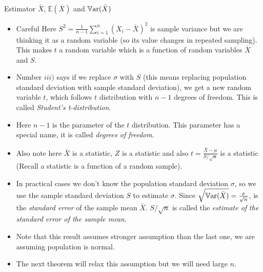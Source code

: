 \documentclass[8pt, usepdftitle=false]{beamer}
\begin{document}
\begin{frame}[allowframebreaks]{Estimator $\bar{X}$, $\mathbb{E}(\bar{X})$ and $\mathbb{V}\mathrm{ar}{(}\bar{X})$}
\begin{itemize}
  \item  {\color{red} Careful} Here $ S^{2} = \frac{1}{n-1} \sum_{i=1}^{n} (X_i - \bar{X})^2$ is sample variance but we are thinking it as a random variable (so its value changes in repeated sampling). This makes $t$ a random variable which is a function of random variables $\bar{X}$ and $S$. 

  \item Number $iii)$ says if we replace $\sigma$ with $S$ (this means replacing population standard deviation with sample standard deviation), we get a new random variable $t$, which follows $t$ distribution with $n-1$ degrees of freedom. This is called \emph{Student's t-distribution}. 

  \item Here $n- 1$ is the parameter of the $t$ distribution. This parameter has a special name, it is called \emph{degrees of freedom}. 



  \item Also note here $\bar{X}$ is a statistic, $Z$ is a statistic and also $t = \frac{\bar{X} - \mu}{S / \sqrt{n}} $ is a statistic (Recall a statistic is a function of a random sample). 

  \item In practical cases we don't know the population standard deviation $\sigma$, so we use the sample standard deviation $S$ to estimate $\sigma$. Since $\sqrt{\mathbb{V}\mathrm{ar}{(}\bar{X})} = \frac{\sigma}{\sqrt{n}}$, is the \emph{standard error} of the sample mean $\bar{X}$. $S / \sqrt{n}$ is called the \emph{estimate of the standard error of the sample mean}.


  \item Note that this result assumes stronger assumption than the last one, we are assuming population is normal.

  \item The next theorem will relax this assumption but we will need large $n$.




  \framebreak




 



\end{itemize}
\end{frame}
\end{document}
